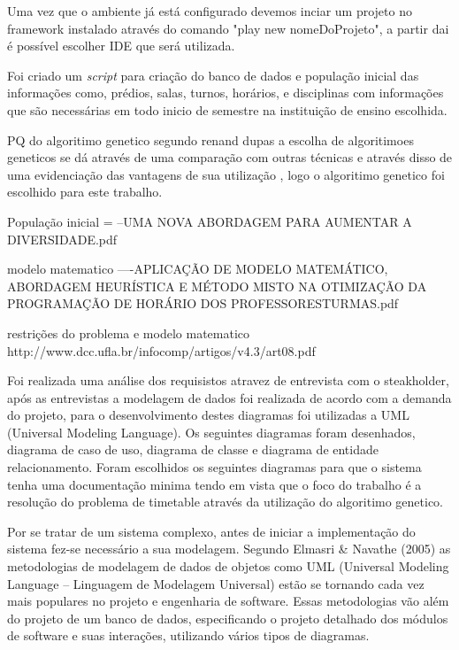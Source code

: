 \documentclass{abntpuc}
\begin{document}
Uma vez que o ambiente já está configurado devemos inciar um projeto no framework instalado através do comando "play new nomeDoProjeto", a partir dai é possível escolher IDE que será utilizada.

Foi criado um \textit{script} para criação do banco de dados e população inicial das informações como, prédios, salas, turnos, horários, e disciplinas com informações que são necessárias em todo inicio de semestre na instituição de ensino escolhida.

PQ do algoritimo genetico
segundo renand dupas a escolha de algoritimoes geneticos se dá através de uma comparação com outras técnicas e através disso de uma evidenciação das vantagens de sua utilização , logo o algoritimo genetico foi escolhido para este trabalho.

População inicial = --UMA NOVA ABORDAGEM PARA AUMENTAR A DIVERSIDADE.pdf

modelo matematico ----APLICAÇÃO DE MODELO MATEMÁTICO, ABORDAGEM HEURÍSTICA E MÉTODO MISTO NA OTIMIZAÇÃO DA PROGRAMAÇÃO DE HORÁRIO DOS PROFESSORESTURMAS.pdf

restrições do problema e modelo matematico http://www.dcc.ufla.br/infocomp/artigos/v4.3/art08.pdf

Foi realizada uma análise dos requisistos atravez de entrevista com o steakholder, após as entrevistas a modelagem de dados foi realizada de acordo com a demanda do projeto, para o desenvolvimento destes diagramas foi utilizadas a UML (Universal Modeling Language). Os seguintes diagramas foram desenhados, diagrama de caso de uso, diagrama de classe e diagrama de entidade relacionamento. Foram escolhidos os seguintes diagramas para que o sistema tenha uma documentação minima tendo em vista que o foco do trabalho é a resolução do problema de timetable através da utilização do algoritimo genetico.

Por se tratar de um sistema complexo, antes de iniciar a implementação do sistema
fez-se necessário a sua modelagem. Segundo Elmasri & Navathe (2005) as metodologias
de modelagem de dados de objetos como UML (Universal Modeling Language –
Linguagem de Modelagem Universal) estão se tornando cada vez mais populares no
projeto e engenharia de software. Essas metodologias vão além do projeto de um banco de
dados, especificando o projeto detalhado dos módulos de software e suas interações,
utilizando vários tipos de diagramas.\par

\end{document}

